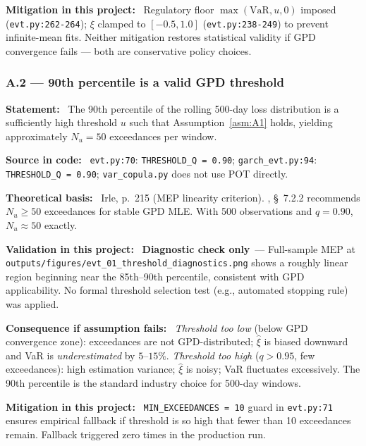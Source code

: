 \documentclass[11pt,a4paper]{article}
\newcommand{\asmfield}[1]{\medskip\noindent\textbf{#1:}\ }
\newcommand{\code}[1]{\texttt{#1}}
\newcommand{\diagnostic}{\textbf{Diagnostic check only}}
\begin{document}
\asmfield{Mitigation in this project}
Regulatory floor $\max(\text{VaR}, u, 0)$ imposed (\code{evt.py:262-264});
$\xi$ clamped to $[-0.5, 1.0]$ (\code{evt.py:238-249}) to prevent
infinite-mean fits. Neither mitigation restores statistical validity if GPD
convergence fails --- both are conservative policy choices.

\subsubsection{A.2 --- 90th percentile is a valid GPD threshold}\label{asm:A2}

\asmfield{Statement}
The 90th percentile of the rolling 500-day loss distribution is a
sufficiently high threshold $u$ such that Assumption~\cref{asm:A1}
holds, yielding approximately $N_u = 50$ exceedances per window.

\asmfield{Source in code}
\code{evt.py:70}: \lstinline|THRESHOLD_Q = 0.90|;
\code{garch\_evt.py:94}: \lstinline|THRESHOLD_Q = 0.90|;
\code{var\_copula.py} does not use POT directly.

\asmfield{Theoretical basis}
Irle, p.~215 (MEP linearity criterion). \cite{McNeilFreyEmbrechts2005},
\S~7.2.2 recommends $N_u \ge 50$ exceedances for stable GPD MLE.
With 500 observations and $q = 0.90$, $N_u \approx 50$ exactly.

\asmfield{Validation in this project}
\diagnostic\ --- Full-sample MEP at \code{outputs/figures/evt\_01\_threshold\_diagnostics.png}
shows a roughly linear region beginning near the 85th--90th percentile,
consistent with GPD applicability. No formal threshold selection test
(e.g., automated stopping rule) was applied.

\asmfield{Consequence if assumption fails}
\emph{Threshold too low} (below GPD convergence zone): exceedances are not
GPD-distributed; $\hat{\xi}$ is biased downward and VaR is
\emph{underestimated} by $5$--$15\%$. \emph{Threshold too high}
($q > 0.95$, few exceedances): high estimation variance; $\hat{\xi}$ is
noisy; VaR fluctuates excessively. The 90th percentile is the standard
industry choice for 500-day windows.

\asmfield{Mitigation in this project}
\code{MIN\_EXCEEDANCES = 10} guard in \code{evt.py:71} ensures empirical
fallback if threshold is so high that fewer than 10 exceedances remain.
Fallback triggered zero times in the production run.

\end{document}
